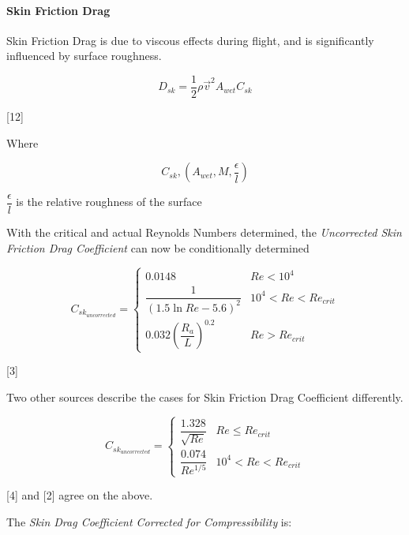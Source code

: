 \documentclass[]{article}
\let\oldparagraph\paragraph
\renewcommand{\paragraph}[1]{\oldparagraph{#1}\mbox{}}
\begin{document}
\paragraph{Skin Friction Drag}\label{skin-friction-drag}

Skin Friction Drag is due to viscous effects during flight, and is
significantly influenced by surface roughness.

\begin{equation}
\label{friction_drag_force}
D_{sk} = \dfrac{1}{2} \rho \vec{v}^2 A_{wet} C_{sk}
\end{equation}

{[}12{]}

Where

\begin{equation}
\label{friction_drag_coefficient}
C_{sk}, (A_{wet}, M, \dfrac{\epsilon}{l} )
\end{equation}

\(\dfrac{\epsilon}{l}\) is the relative roughness of the surface

With the critical and actual Reynolds Numbers determined, the
\emph{Uncorrected Skin Friction Drag Coefficient} can now be
conditionally determined

\begin{equation}
\label{eq_skin_drag_coefficient_uncorrected}
C_{sk_{uncorrected}} = 
\begin{cases}
    0.0148                                    & Re < 10^4 \\
    \dfrac{1}{(1.5 \ln Re - 5.6)^2}            & 10^4 < Re < Re_{crit} \\
    0.032 \left( \dfrac{R_a}{L} \right)^{0.2} & Re > Re_{crit}
\end{cases}
\end{equation}

{[}3{]}

Two other sources describe the cases for Skin Friction Drag Coefficient
differently.

\begin{equation}
C_{sk_{uncorrected}} = 
\begin{cases}
    \dfrac{1.328}{\sqrt{Re}} & Re \le Re_{crit} \\
    \dfrac{0.074}{Re^{1/5}}  & 10^4 < Re < Re_{crit}
\end{cases}
\end{equation}

{[}4{]} and {[}2{]} agree on the above.

The \emph{Skin Drag Coefficient Corrected for Compressibility} is:
\end{document}
